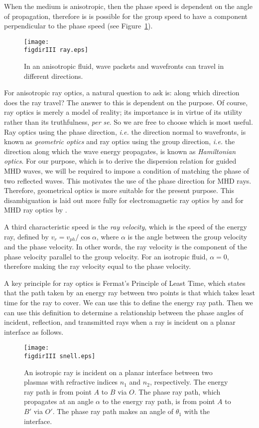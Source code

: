 	When the medium is anisotropic, then the phase speed is dependent on the angle of propagation, therefore is is possible for the group speed to have a component perpendicular to the phase speed (see Figure~\ref{fig: anisotropic ray direction}).
	\begin{figure}
		\centering
		\texttt{[image: \\figdirIII ray.eps]}
		\caption{In an anisotropic fluid, wave packets and wavefronts can travel in different directions.}
		\label{fig: anisotropic ray direction}
	\end{figure}
	For anisotropic ray optics, a natural question to ask is: along which direction does the ray travel? The answer to this is dependent on the purpose. Of course, ray optics is merely a model of reality; its importance is in virtue of its utility rather than its truthfulness, \textit{per se}. So we are free to choose which is most useful. Ray optics using the phase direction, \textit{i.e.} the direction normal to wavefronts, is known as \textit{geometric optics} and ray optics using the group direction, \textit{i.e.} the direction along which the wave energy propagates, is known as \textit{Hamiltonian optics}. For our purpose, which is to derive the dispersion relation for guided MHD waves, we will be required to impose a condition of matching the phase of two reflected waves. This motivates the use of the phase direction for MHD rays. Therefore, geometrical optics is more suitable for the present purpose. This disambiguation is laid out more fully for electromagnetic ray optics by \cite{has88} and for MHD ray optics by \cite{wal77}.
	
	A third characteristic speed is the \textit{ray velocity}, which is the speed of the energy ray, defined by $v_r = v_{ph}/\cos{\alpha}$, where $\alpha$ is the angle between the group velocity and the phase velocity. In other words, the ray velocity is the component of the phase velocity parallel to the group velocity. For an isotropic fluid, $\alpha = 0$, therefore making the ray velocity equal to the phase velocity.
	
	A key principle for ray optics is Fermat's Principle of Least Time, which states that the path taken by an energy ray between two points is that which takes least time for the ray to cover. We can use this to define the energy ray path. Then we can use this definition to determine a relationship between the phase angles of incident, reflection, and transmitted rays when a ray is incident on a planar interface as follows.
	
	\begin{figure}
		\centering
		\texttt{[image: \\figdirIII snell.eps]}
		\caption{An isotropic ray is incident on a planar interface between two plasmas with refractive indices $n_1$ and $n_2$, respectively. The energy ray path is from point $A$ to $B$ via $O$. The phase ray path, which propagates at an angle $\alpha$ to the energy ray path, is from point $A$ to $B'$ via $O'$. The phase ray path makes an angle of $\theta_1$ with the interface.}
		\label{fig: fermat}
	\end{figure}
	
